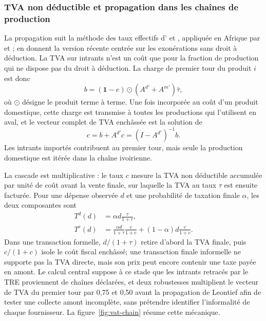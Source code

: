 \documentclass[11pt,a4paper]{article}
\begin{document}
\subsubsection{TVA non déductible et propagation dans les chaînes de production}

La propagation suit la méthode des taux effectifs d'\citet{ahmadstern1984} et
\citet{ahmadstern1991}, appliquée en Afrique par \citet{rajemisonyounger2000}
et \citet{chen2001}; \citet{chandler2025} en donnent la version récente
centrée sur les exonérations sans droit à déduction. La TVA sur intrants n'est
un coût que pour la fraction de production qui ne dispose pas du droit à
déduction. La charge de premier tour du produit $i$ est
donc
\begin{equation}
b=(\mathbf 1-e)\odot(A^{d\prime}+A^{m\prime})\bar\tau,
\label{eq:first-round}
\end{equation}
où $\odot$ désigne le produit terme à terme. Une fois incorporée au coût d'un
produit domestique, cette charge est transmise à toutes les productions qui
l'utilisent en aval, et le vecteur complet de TVA enchâssée est la solution de
\begin{equation}
c=b+A^{d\prime}c
  =(I-A^{d\prime})^{-1}b.
\label{eq:leontief-vat}
\end{equation}
Les intrants importés contribuent au premier tour, mais seule la production
domestique est itérée dans la chaîne ivoirienne.

La cascade est multiplicative : le taux $c$ mesure la TVA non déductible
accumulée par unité de coût avant la vente finale, sur laquelle la TVA au taux
$\tau$ est ensuite facturée. Pour une dépense observée $d$ et une probabilité de
taxation finale $\alpha$, les deux composantes sont
\begin{align}
T^d(d)&=\alpha d\frac{\tau}{1+\tau},\\
T^e(d)&=\frac{\alpha d}{1+\tau}\frac{c}{1+c}
       +(1-\alpha)d\frac{c}{1+c}.
\label{eq:io-incidence}
\end{align}
Dans une transaction formelle, $d/(1+\tau)$ retire d'abord la TVA finale, puis
$c/(1+c)$ isole le coût fiscal enchâssé; une transaction finale informelle ne
supporte pas la TVA directe, mais son prix peut encore contenir une taxe payée
en amont. Le calcul central suppose à ce stade que les intrants retracés par le
TRE proviennent de chaînes déclarées, et deux robustesses multiplient le vecteur
de TVA du premier tour par 0,75 et 0,50 avant la propagation de Leontief afin de
tester une collecte amont incomplète, sans prétendre identifier l'informalité de
chaque fournisseur. La figure~\ref{fig:vat-chain} résume cette mécanique.
\end{document}
